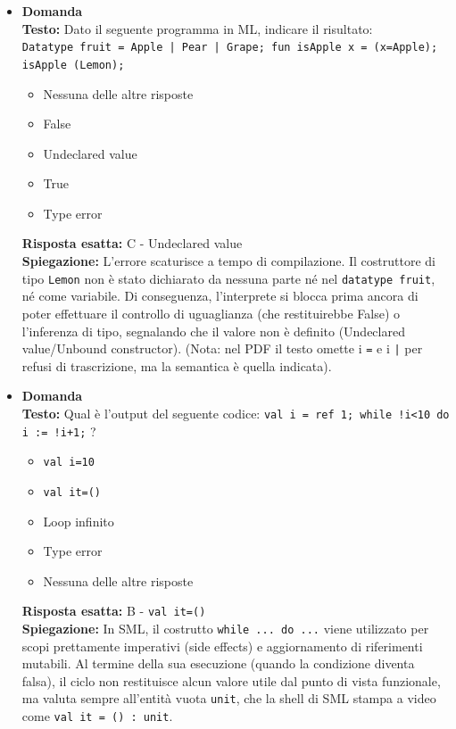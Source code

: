\documentclass[12pt, a4paper]{article}
\newcounter{domandateoria}
\begin{document}
\begin{itemize}
\newpage

    \item {}\textbf{Domanda \thedomandateoria} \\
    \textbf{Testo:} Dato il seguente programma in ML, indicare il risultato: \\
    \texttt{Datatype fruit = Apple | Pear | Grape; fun isApple x = (x=Apple); isApple (Lemon);}
    \begin{itemize}
        \item[A)] Nessuna delle altre risposte
        \item[B)] False
        \item[C)] Undeclared value
        \item[D)] True
        \item[E)] Type error
    \end{itemize}
    \textbf{Risposta esatta:} C - Undeclared value \\
    \textbf{Spiegazione:} L'errore scaturisce a tempo di compilazione. Il costruttore di tipo \texttt{Lemon} non è stato dichiarato da nessuna parte né nel \texttt{datatype fruit}, né come variabile. Di conseguenza, l'interprete si blocca prima ancora di poter effettuare il controllo di uguaglianza (che restituirebbe False) o l'inferenza di tipo, segnalando che il valore non è definito (Undeclared value/Unbound constructor). (Nota: nel PDF il testo omette i \texttt{=} e i \texttt{|} per refusi di trascrizione, ma la semantica è quella indicata).
    \vspace{0.3cm}

    \item {}\textbf{Domanda \thedomandateoria} \\
    \textbf{Testo:} Qual è l'output del seguente codice: \texttt{val i = ref 1; while !i<10 do i := !i+1;} ?
    \begin{itemize}
        \item[A)] \texttt{val i=10}
        \item[B)] \texttt{val it=()}
        \item[C)] Loop infinito
        \item[D)] Type error
        \item[E)] Nessuna delle altre risposte
    \end{itemize}
    \textbf{Risposta esatta:} B - \texttt{val it=()} \\
    \textbf{Spiegazione:} In SML, il costrutto \texttt{while ... do ...} viene utilizzato per scopi prettamente imperativi (side effects) e aggiornamento di riferimenti mutabili. Al termine della sua esecuzione (quando la condizione diventa falsa), il ciclo non restituisce alcun valore utile dal punto di vista funzionale, ma valuta sempre all'entità vuota \texttt{unit}, che la shell di SML stampa a video come \texttt{val it = () : unit}.
    \vspace{0.3cm}


\end{itemize}
\end{document}
